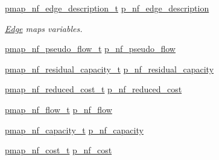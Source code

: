 \begin{DoxyCompactItemize}
\hyperlink{classnetwork__flow_a1ea6b2ccbcafb4ecd4d6fb0e64b53350}{pmap\+\_\+nf\+\_\+edge\+\_\+description\+\_\+t} \hyperlink{classnetwork__flow_af701439f65d4ff2eacf47ef05ca94885}{p\+\_\+nf\+\_\+edge\+\_\+description}
\begin{DoxyCompactList}\small\item\em \hyperlink{structEdge}{Edge} maps variables. \end{DoxyCompactList}\item 
\hyperlink{classnetwork__flow_ae2897f4e40c2208d05a1939f4c2f626f}{pmap\+\_\+nf\+\_\+pseudo\+\_\+flow\+\_\+t} \hyperlink{classnetwork__flow_a163ed5310281866485a8d0f2c1790822}{p\+\_\+nf\+\_\+pseudo\+\_\+flow}
\item 
\hyperlink{classnetwork__flow_a853061022784c1835c390a91e1691839}{pmap\+\_\+nf\+\_\+residual\+\_\+capacity\+\_\+t} \hyperlink{classnetwork__flow_a2fa45449cc9a0a87edff12fbdae718c6}{p\+\_\+nf\+\_\+residual\+\_\+capacity}
\item 
\hyperlink{classnetwork__flow_a54ee3bb5e8f6488106a18c778c2ab92e}{pmap\+\_\+nf\+\_\+reduced\+\_\+cost\+\_\+t} \hyperlink{classnetwork__flow_a5b34d0732f83191a038bd7031d7aa765}{p\+\_\+nf\+\_\+reduced\+\_\+cost}
\item 
\hyperlink{classnetwork__flow_ab39a2916cb880c6ee352ff76b2378514}{pmap\+\_\+nf\+\_\+flow\+\_\+t} \hyperlink{classnetwork__flow_ad5848d314290ca974af12d892f200bea}{p\+\_\+nf\+\_\+flow}
\item 
\hyperlink{classnetwork__flow_a234594983ab43e779b43424c829cdcca}{pmap\+\_\+nf\+\_\+capacity\+\_\+t} \hyperlink{classnetwork__flow_a686fe21b72f5bbe7e19c7797ef81a1bb}{p\+\_\+nf\+\_\+capacity}
\item 
\hyperlink{classnetwork__flow_ab3d76d6bf04d076c74f5f51cc55f621e}{pmap\+\_\+nf\+\_\+cost\+\_\+t} \hyperlink{classnetwork__flow_a13aa2e8135f2954b73821a0180295e32}{p\+\_\+nf\+\_\+cost}
\end{DoxyCompactItemize}
